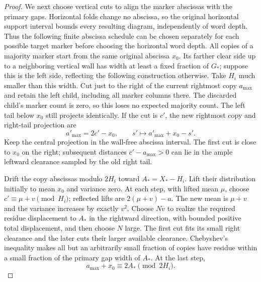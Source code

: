 \begin{proof}
We next choose vertical cuts to align the marker abscissas with the
primary gaps.  Horizontal folds change no abscissa, so the original
horizontal support interval bounds every resulting diagram,
independently of word depth.  Thus the following finite abscissa
schedule can be chosen separately for each possible target marker
before choosing the horizontal word depth.  All copies of a majority
marker start from the same original abscissa $x_0$.  Its farther clear
side up to a neighboring
vertical wall has width at least a fixed fraction of $G_*$; suppose
this is the left side, reflecting the following construction otherwise.
Take $H_i$ much smaller than this width.  Cut just to the right of
the current rightmost copy $a_{\max}$ and retain the left child,
including all marker columns there.  The discarded child's marker
count is zero, so this loses no expected majority count.  The left
tail below $x_0$ still projects identically.  If the cut is $c'$, the
new rightmost copy and right-tail projection are
\begin{equation}
 a'_{\max}=2c'-x_0,\qquad
 s'\longmapsto a'_{\max}+x_0-s'.
 \label{hol:tail-fold}
\end{equation}
Keep the central projection in the wall-free abscissa interval.
The first cut is close to $x_0$ on the right; subsequent distances
$c'-a_{\max}>0$ can lie in the ample leftward clearance sampled
by the old right tail.

Drift the copy abscissas modulo $2H_i$ toward
$A_*=X_*-H_i$.  Lift their distribution initially to mean $x_0$
and variance zero.  At each step, with lifted mean $\mu$, choose
$c'\equiv\mu+v\pmod{H_i}$; reflected lifts are
$2(\mu+v)-a$.  The new mean is $\mu+v$ and the variance increases
by exactly $v^2$.  Choose $Nv$ to realize the required residue
displacement to $A_*$ in the rightward direction, with bounded positive
total displacement, and then choose $N$ large.  The first cut fits
its small right clearance and the later cuts their larger available
clearance.  Chebyshev's inequality makes all but an arbitrarily small
fraction of copies have residue within a small fraction of the primary
gap width of $A_*$.  At the last step,
\begin{equation}
 a_{\max}+x_0\equiv2A_*\pmod{2H_i}.
 \label{hol:right-tail-residue}
\end{equation}


\end{proof}
